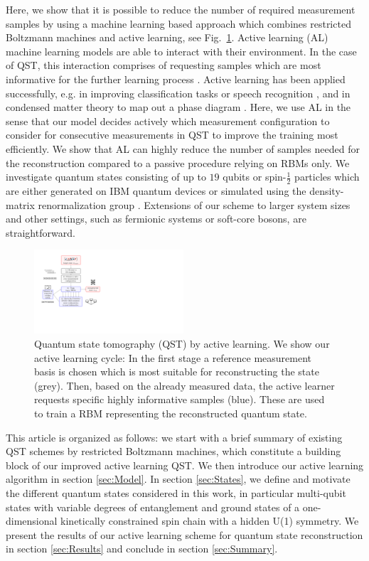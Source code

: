 \documentclass[pra,aps,showpacs,groupedaddress,superscriptaddress,twocolumn,toc=flat,biblatex,footinbib]{revtex4-1}
\begin{document}
Here, we show that it is possible to reduce the number of required measurement samples by using a machine learning based approach which combines restricted Boltzmann machines and active learning, see Fig.~\ref{fig:AL}. Active learning (AL) machine learning models are able to interact with their environment. In the case of QST, this interaction comprises of requesting samples which are most informative for the further learning process \cite{Settles2009}. Active learning has been applied successfully, e.g. in improving classification tasks \cite{Greiner2002, TongChang2001} or speech recognition \cite{Tur2005}, and in condensed matter theory to map out a phase diagram \cite{Ding2021}. 
Here, we use AL in the sense that our model decides actively which measurement configuration to consider for consecutive measurements in QST to improve the training most efficiently. We show that AL can highly reduce the number of samples needed for the reconstruction compared to a passive procedure relying on RBMs only. We investigate quantum states consisting of up to $19$ qubits or spin-$\frac{1}{2}$ particles which are either generated on IBM quantum devices or simulated using the density-matrix renormalization group \cite{Schollwoeck2011}. Extensions of our scheme to larger system sizes and other settings, such as fermionic systems or soft-core bosons, are straightforward.

\begin{figure}[t]
	\centering
  \includegraphics[width=0.495\textwidth]{Procedure2.pdf}
	\caption[Active learning procedure]{Quantum state tomography (QST) by active learning. We show our active learning cycle: In the first stage a reference measurement basis is chosen which is most suitable for reconstructing the state (grey). Then, based on the already measured data, the active learner requests specific highly informative samples (blue). These are used to train a RBM representing the reconstructed quantum state.}
	\label{fig:AL}
\end{figure}

This article is organized as follows: we start with a brief summary of existing QST schemes by restricted Boltzmann machines, which constitute a building block of our improved active learning QST. We then introduce our active learning algorithm in section \ref{sec:Model}. In section \ref{sec:States}, we define and motivate the different quantum states considered in this work, in particular multi-qubit states with variable degrees of entanglement and ground states of a one-dimensional kinetically constrained spin chain with a hidden U(1) symmetry. We present the results of our active learning scheme for quantum state reconstruction in section \ref{sec:Results} and conclude in section \ref{sec:Summary}. 
\end{document}

